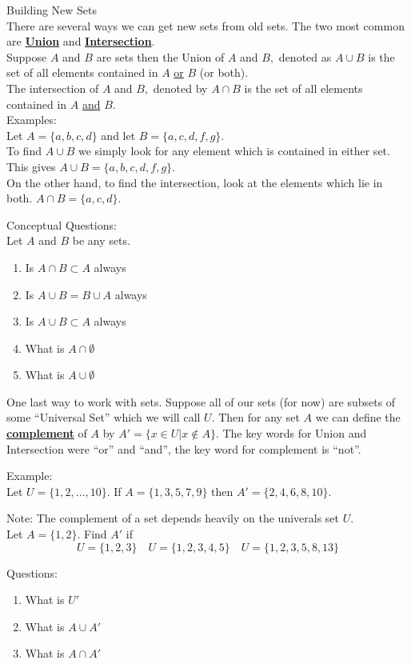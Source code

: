 \documentclass[14,fleqn]{article}
\newcommand{\defn}[1]{\textbf{\underline{#1}}}
\begin{document}
Building New Sets\\
There are several ways we can get new sets from old sets. The two most common are \defn{Union} and \defn{Intersection}.\\

Suppose $A$ and $B$ are sets then the Union of $A$ and $B,$ denoted as $A\cup B$ is the set of all elements contained in $A$ \underline{or} $B$ (or both).\\

The intersection of $A$ and $B,$ denoted by $A\cap B$ is the set of all elements contained in $A$ \underline{and} $B.$\\

Examples:\\
Let $A=\{a,b,c,d\}$ and let $B=\{a,c,d,f,g\}$.\\
To find $A\cup B$ we simply look for any element which is contained in either set. This gives $A\cup B=\{a,b,c,d,f,g\}.$\\
On the other hand, to find the intersection, look at the elements which lie in both. $A\cap B=\{a,c,d\}.$

Conceptual Questions:\\
Let $A$ and $B$ be any sets.
\begin{enumerate}
	\item Is $A\cap B\subset A$ always
	\item Is $A\cup B=B\cup A$ always
	\item Is $A\cup B\subset A$ always
	\item What is $A\cap \emptyset$
	\item What is $A\cup \emptyset$
\end{enumerate}

One last way to work with sets. Suppose all of our sets (for now) are subsets of some ``Universal Set'' which we will call $U.$ Then for any set $A$ we can define the \defn{complement} of $A$ by $A'=\{x\in U|x\notin A\}.$ The key words for Union and Intersection were ``or'' and ``and'', the key word for complement is ``not''.

Example:\\
Let $U=\{1,2,\dots,10\}.$ If $A=\{1,3,5,7,9\}$ then $A'=\{2,4,6,8,10\}.$

Note: The complement of a set depends heavily on the univerals set $U.$\\
Let $A=\{1,2\}.$ Find $A'$ if
\[
	U=\{1,2,3\}\quad U=\{1,2,3,4,5\} \quad U=\{1,2,3,5,8,13\}
\]

Questions:\\
\begin{enumerate}
	\item What is $U'$
	\item What is $A\cup A'$
	\item What is $A\cap A'$
\end{enumerate}
\end{document}
